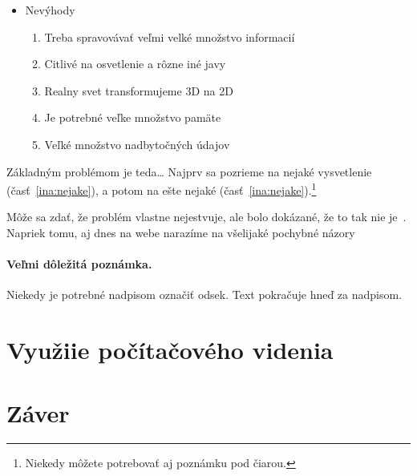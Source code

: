 \documentclass[10pt,twoside,slovak,a4paper]{coursepaper}
\begin{document}
\begin{itemize}
\item Nevýhody
	\begin{enumerate}
	\item Treba spravovávať veľmi velké množstvo informacií
	\item Citlivé na osvetlenie a rôzne iné javy
	\item Realny svet transformujeme 3D na 2D
	\item Je potrebné veľke množstvo pamäte
	\item Veľké množstvo nadbytočných údajov 
	\end{enumerate}
\end{itemize}


Základným problémom je teda\ldots{} Najprv sa pozrieme na nejaké vysvetlenie (časť~\ref{ina:nejake}), a potom na ešte nejaké (časť~\ref{ina:nejake}).\footnote{Niekedy môžete potrebovať aj poznámku pod čiarou.}

Môže sa zdať, že problém vlastne nejestvuje\cite{Coplien:MPD}, ale bolo dokázané, že to tak nie je~\cite{Czarnecki:Staged, Czarnecki:Progress}. Napriek tomu, aj dnes na webe narazíme na všelijaké pochybné názory%




\paragraph{Veľmi dôležitá poznámka.}
Niekedy je potrebné nadpisom označiť odsek. Text pokračuje hneď za nadpisom.


\section{Využiie počítačového videnia} \label{zaver} 


\section{Záver} \label{zaver} %






\end{document}
